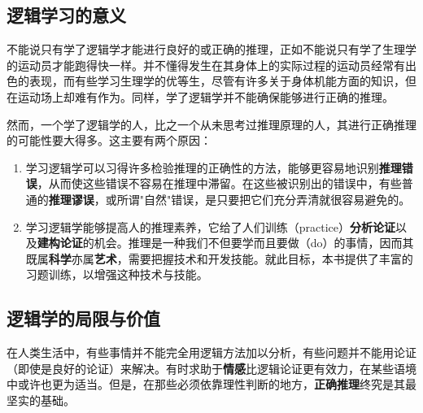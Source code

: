 \subsection{逻辑学习的意义}

不能说只有学了逻辑学才能进行良好的或正确的推理，正如不能说只有学了生理学的运动员才能跑得快一样。并不懂得发生在其身体上的实际过程的运动员经常有出色的表现，而有些学习生理学的优等生，尽管有许多关于身体机能方面的知识，但在运动场上却难有作为。同样，学了逻辑学并不能确保能够进行正确的推理。

然而，一个学了逻辑学的人，比之一个从未思考过推理原理的人，其进行正确推理的可能性要大得多。这主要有两个原因：

\begin{enumerate}
  \item 学习逻辑学可以习得许多检验推理的正确性的方法，能够更容易地识别\textbf{推理错误}，从而使这些错误不容易在推理中滞留。在这些被识别出的错误中，有些普通的\textbf{推理谬误}，或所谓"自然"错误，是只要把它们充分弄清就很容易避免的。
  
  \item 学习逻辑学能够提高人的推理素养，它给了人们训练（practice）\textbf{分析论证}以及\textbf{建构论证}的机会。推理是一种我们不但要学而且要做（do）的事情，因而其既属\textbf{科学}亦属\textbf{艺术}，需要把握技术和开发技能。就此目标，本书提供了丰富的习题训练，以增强这种技术与技能。
\end{enumerate}

\subsection{逻辑学的局限与价值}

在人类生活中，有些事情并不能完全用逻辑方法加以分析，有些问题并不能用论证（即使是良好的论证）来解决。有时求助于\textbf{情感}比逻辑论证更有效力，在某些语境中或许也更为适当。但是，在那些必须依靠理性判断的地方，\textbf{正确推理}终究是其最坚实的基础。

\begin{center}
\end{center} 